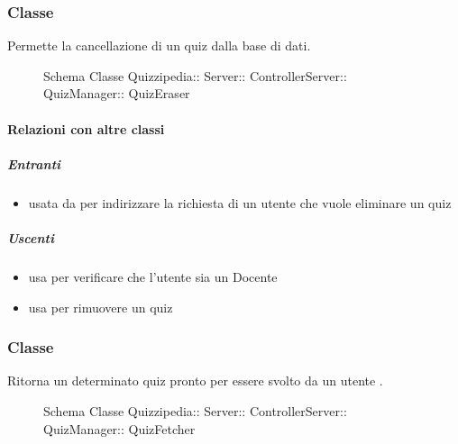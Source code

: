 \subsubsection{Classe }
Permette la cancellazione di un quiz dalla base di dati.
\begin{figure}[H]
\centering
\noindent{}
\caption[Schema Classe QuizEraser]{Schema Classe Quizzipedia:: Server:: ControllerServer:: QuizManager:: QuizEraser}
\end{figure}
\paragraph{Relazioni con altre classi}
\subparagraph{Entranti}
\begin{itemize}
\item usata da  per indirizzare la richiesta di un utente che vuole eliminare un quiz
\end{itemize}
\subparagraph{Uscenti}
\begin{itemize}
\item usa  per verificare che l'utente sia un Docente
\item usa  per rimuovere un quiz
\end{itemize}
\subsubsection{Classe }
Ritorna un determinato quiz pronto per essere svolto da un utente .
\begin{figure}[H]
\centering
\noindent{}
\caption[Schema Classe QuizFetcher]{Schema Classe Quizzipedia:: Server:: ControllerServer:: QuizManager:: QuizFetcher}
\end{figure}
